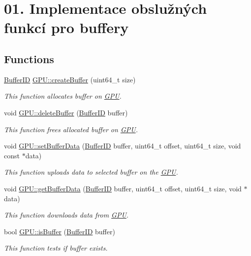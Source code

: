 \hypertarget{group__buffer__tasks}{}\section{01. Implementace obslužných funkcí pro buffery}
\label{group__buffer__tasks}
\subsection*{Functions}
\begin{DoxyCompactItemize}
\item 
\hyperlink{fwd_8hpp_a5114031b77b80ad895eff688720b7f93}{Buffer\+ID} \hyperlink{group__buffer__tasks_ga309724692e0d90a686642379f12d8d44}{G\+P\+U\+::create\+Buffer} (uint64\+\_\+t size)
\begin{DoxyCompactList}\small\item\em This function allocates buffer on \hyperlink{classGPU}{G\+PU}. \end{DoxyCompactList}\item 
void \hyperlink{group__buffer__tasks_ga05fb19b7c8b51a92162517aa7f25a166}{G\+P\+U\+::delete\+Buffer} (\hyperlink{fwd_8hpp_a5114031b77b80ad895eff688720b7f93}{Buffer\+ID} buffer)
\begin{DoxyCompactList}\small\item\em This function frees allocated buffer on \hyperlink{classGPU}{G\+PU}. \end{DoxyCompactList}\item 
void \hyperlink{group__buffer__tasks_ga97e1e76065fd913d6624b4c03164dcec}{G\+P\+U\+::set\+Buffer\+Data} (\hyperlink{fwd_8hpp_a5114031b77b80ad895eff688720b7f93}{Buffer\+ID} buffer, uint64\+\_\+t offset, uint64\+\_\+t size, void const $\ast$data)
\begin{DoxyCompactList}\small\item\em This function uploads data to selected buffer on the \hyperlink{classGPU}{G\+PU}. \end{DoxyCompactList}\item 
void \hyperlink{group__buffer__tasks_ga7b89dbe4afbfec3725c64000b37445af}{G\+P\+U\+::get\+Buffer\+Data} (\hyperlink{fwd_8hpp_a5114031b77b80ad895eff688720b7f93}{Buffer\+ID} buffer, uint64\+\_\+t offset, uint64\+\_\+t size, void $\ast$data)
\begin{DoxyCompactList}\small\item\em This function downloads data from \hyperlink{classGPU}{G\+PU}. \end{DoxyCompactList}\item 
bool \hyperlink{group__buffer__tasks_gae725a1955d617a7e655ab751c6e05e97}{G\+P\+U\+::is\+Buffer} (\hyperlink{fwd_8hpp_a5114031b77b80ad895eff688720b7f93}{Buffer\+ID} buffer)
\begin{DoxyCompactList}\small\item\em This function tests if buffer exists. \end{DoxyCompactList}\end{DoxyCompactItemize}


